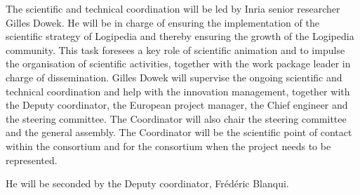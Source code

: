 \begin{workpackage}[id=management,type=MGT,wphases=1-48,
  short=Management,
  title=Management,
  lead=Inr,InrRM=34,InnRM=2,SacRM=2,TumRM=2,LieRM=2,BelRM=2,DelRM=2,FauRM=2]
\begin{tasklist}
  \begin{task}[id=coordination,title=Scientific and technical coordination,shorttitle=Sci.\&tech.,lead=Inr,InrRM=20,wphases=1-48]
    The scientific and technical coordination will be led by Inria
    senior researcher Gilles Dowek. He will be in charge of ensuring
    the implementation of the scientific strategy of Logipedia and
    thereby ensuring the growth of the Logipedia community. This task
    foresees a key role of scientific animation and to impulse the
    organisation of scientific activities, together with the work package
    leader
    in charge of dissemination. Gilles Dowek will supervise the
    ongoing scientific and technical coordination and help with the
    innovation management, together with the Deputy coordinator,
    the European project manager, 
    the
    Chief engineer and the steering committee. The
    Coordinator will also chair the steering committee and the general
    assembly. The Coordinator will be the scientific point of contact
    within the consortium and for the consortium when the project
    needs to be represented.

    He will be seconded by the Deputy coordinator, Frédéric
    Blanqui.
  \end{task}


\end{tasklist}
\end{workpackage}
